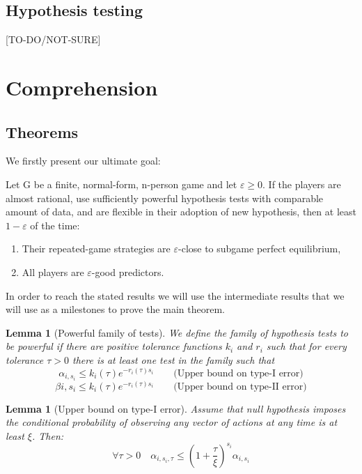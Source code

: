\documentclass[]{spie}  %
\newtheorem{lemma}[theorem]{Lemma}
\begin{document}
\subsection{Hypothesis testing}
\label{sec:hypothesis}
[TO-DO/NOT-SURE]


\newpage
\section{Comprehension}
\label{sec:main}


\subsection{Theorems}
\label{sec:th}

We firstly present our ultimate goal:

\begin{theo}
\label{maintheorem}
Let G be a finite, normal-form, n-person game and let $\varepsilon \geq 0$. If the players are almost rational, use sufficiently powerful hypothesis tests with comparable amount of data, and are flexible in their adoption of new hypothesis, then at least $1-\varepsilon$ of the time:
\begin{enumerate}[I]
    \item Their repeated-game strategies are $\varepsilon$-close to subgame perfect equilibrium,
    \item All players are $\varepsilon$-good predictors.
\end{enumerate}
\end{theo}

In order to reach the stated results we will use the intermediate results that we will use as a milestones to prove the main theorem.

\begin{lemma}[Powerful family of tests]
\label{powerful}
We define the family of hypothesis tests to be powerful if there are positive tolerance functions $k_i$ and $r_i$ such that for every tolerance $\tau > 0$ there is at least one test in the family such that
$$ \alpha_{i,s_i} \leq k_i(\tau) e^{-r_i(\tau)s_i} \quad \quad \text{(Upper bound on type-I error)}$$
$$ \beta{i,s_i} \leq k_i(\tau) e^{-r_i(\tau)s_i} \quad \quad \text{(Upper bound on type-II error)}$$
\end{lemma}

\begin{lemma}[Upper bound on type-I error]
\label{upperbounds}
Assume that null hypothesis imposes the conditional probability of observing any vector of actions at any time is at least $\xi$. Then: $$\forall \tau > 0 \quad \alpha_{i,s_i,\tau} \leq (1 + \frac{\tau}{\xi})^{s_i}\alpha_{i,s_i}$$
\end{lemma}
\end{document}
